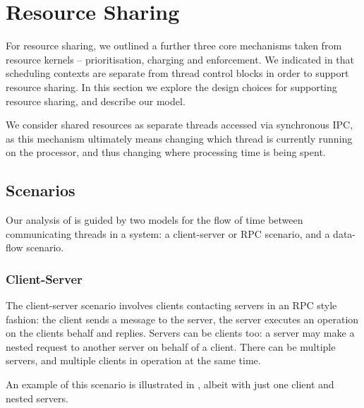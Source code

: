 \section{Resource Sharing}
\label{sec:model-resource-sharing}

For resource sharing, we outlined a further three core mechanisms taken from resource kernels -- prioritisation, charging and enforcement.
We indicated in  that scheduling contexts are separate from thread control blocks in order to support resource sharing.
In this section we explore the design choices for supporting resource sharing, and describe our model.

We consider shared resources as separate threads accessed via synchronous \gls{IPC}, as this mechanism ultimately means changing which thread is currently running on the processor, and thus changing where processing time is being spent.

\subsection{Scenarios}

Our analysis of is guided by two models for the flow of time between communicating threads in a system: a client-server or \gls{RPC} scenario, and a data-flow scenario.

\subsubsection{Client-Server}

The client-server scenario involves clients contacting servers in an \gls{RPC} style fashion: the client sends a message to the server, the server executes an operation on the clients behalf and replies.
Servers can be clients too: a server may make a nested request to another server on behalf of a client.
There can be multiple servers, and multiple clients in operation at the same time.

An example of this scenario is illustrated in , albeit with just one client and   nested servers.

